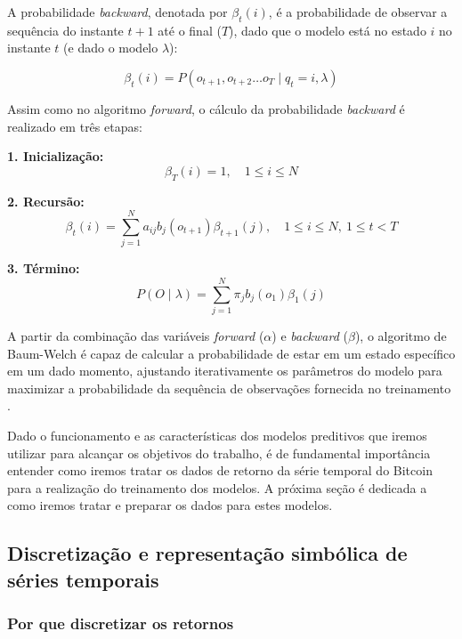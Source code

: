\documentclass[
    12pt,                %
    openright,           %
    oneside,             %
    a4paper,             %
    english,             %
    brazil               %
]{abntex2}
\begin{document}
A probabilidade \textit{backward}, denotada por $\beta_t(i)$, é a probabilidade de observar a sequência do instante $t+1$ até o final ($T$), dado que o 
modelo está no estado $i$ no instante $t$ (e dado o modelo $\lambda$):

\begin{equation}
    \beta_t(i) = P(o_{t+1}, o_{t+2} \dots o_T \mid q_t = i, \lambda)
    \label{eq:probabilidade_backward}
\end{equation}

Assim como no algoritmo \textit{forward}, o cálculo da probabilidade \textit{backward} é realizado em três etapas:

\textbf{1. Inicialização:}
\begin{equation}
    \beta_T(i) = 1, \quad 1 \le i \le N
    \label{eq:inicializacao_backward}
\end{equation}

\textbf{2. Recursão:}
\begin{equation}
    \beta_t(i) = \sum_{j=1}^N a_{ij} b_j(o_{t+1}) \beta_{t+1}(j), \quad 1 \le i \le N, \ 1 \le t < T
    \label{eq:recursao_backward}
\end{equation}

\textbf{3. Término:}
\begin{equation}
    P(O \mid \lambda) = \sum_{j=1}^N \pi_j b_j(o_1) \beta_1(j)
    \label{eq:termino_backward}
\end{equation}

A partir da combinação das variáveis \textit{forward} ($\alpha$) e \textit{backward} ($\beta$), o algoritmo de Baum-Welch é capaz de calcular a 
probabilidade de estar em um estado específico em um dado momento, ajustando iterativamente os parâmetros do modelo para maximizar a probabilidade da 
sequência de observações fornecida no treinamento \cite{jm3}.

Dado o funcionamento e as características dos modelos preditivos que iremos utilizar para alcançar os objetivos do trabalho,
é de fundamental importância entender como iremos tratar os dados de retorno da série temporal do Bitcoin para a realização do treinamento
dos modelos. A próxima seção é dedicada a como iremos tratar e preparar os dados para estes modelos.

\subsection{Discretização e representação simbólica de séries temporais}

\subsubsection{Por que discretizar os retornos}
\end{document}

